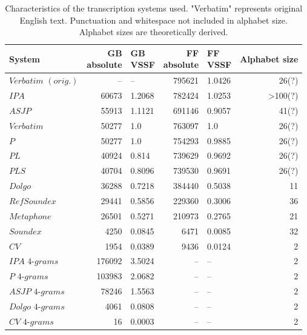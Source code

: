 \begin{table}
\caption{Characteristics of the transcription systems used. "Verbatim" represents original English text. Punctuation and whitespace not included in alphabet size. Alphabet sizes are theoretically derived.}
\label{tab:system_characteristics}
\centering\small
\begin{tabular}{@{}l@{\hspace{1\tabcolsep}}rlrlr@{}} %
\toprule
\bf System & \bf \specialcell{GB\\absolute} & \bf \specialcell{GB\\VSSF} & \bf \specialcell{FF\\absolute} & \bf \specialcell{FF\\VSSF} & \bf Alphabet size \\
\midrule
$Verbatim$ $(orig.)$ & -- & -- & 795621 & 1.0426 & 26(?) \\
$IPA$ & 60673 & 1.2068 & 782424 & 1.0253 & >100(?) \\
$ASJP$ & 55913 & 1.1121 & 691146 & 0.9057 & 41(?) \\
$Verbatim$ & 50277 & 1.0 & 763097 & 1.0 & 26(?) \\
$P$ & 50277 & 1.0 & 754293 & 0.9885 & 26(?) \\
$PL$ & 40924 & 0.814 & 739629 & 0.9692 & 26(?) \\
$PLS$ & 40704 & 0.8096 & 739530 & 0.9691 & 26(?) \\
$Dolgo$ & 36288 & 0.7218 & 384440 & 0.5038 & 11 \\
$RefSoundex$ & 29441 & 0.5856 & 229360 & 0.3006 & 36 \\
$Metaphone$ & 26501 & 0.5271 & 210973 & 0.2765 & 21 \\
$Soundex$ & 4250 & 0.0845 & 6471 & 0.0085 & 32 \\
$CV$ & 1954 & 0.0389 & 9436 & 0.0124 & 2 \\
$IPA$ $4$-$grams$ & 176092 & 3.5024 & -- & -- & 2 \\
$P$ $4$-$grams$ & 103983 & 2.0682 & -- & -- & 2 \\
$ASJP$ $4$-$grams$ & 78246 & 1.5563 & -- & -- & 2 \\
$Dolgo$ $4$-$grams$ & 4061 & 0.0808 & -- & -- & 2 \\
$CV$ $4$-$grams$ & 16 & 0.0003 & -- & -- & 2 \\
\bottomrule
\end{tabular}
\end{table}

